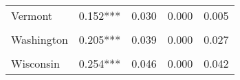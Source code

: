 \begin{table}[!h]
\begin{tabular}[t]{llrrr}
Vermont & 0.152*** & 0.030 & 0.000 & 0.005\\
\cellcolor{gray!10}{Virginia} & \cellcolor{gray!10}{0.137***} & \cellcolor{gray!10}{0.033} & \cellcolor{gray!10}{0.000} & \cellcolor{gray!10}{0.014}\\
Washington & 0.205*** & 0.039 & 0.000 & 0.027\\
\cellcolor{gray!10}{West Virginia} & \cellcolor{gray!10}{0.143**} & \cellcolor{gray!10}{0.064} & \cellcolor{gray!10}{0.025} & \cellcolor{gray!10}{0.006}\\
Wisconsin & 0.254*** & 0.046 & 0.000 & 0.042\\
\bottomrule
\end{tabular}
\end{table}
